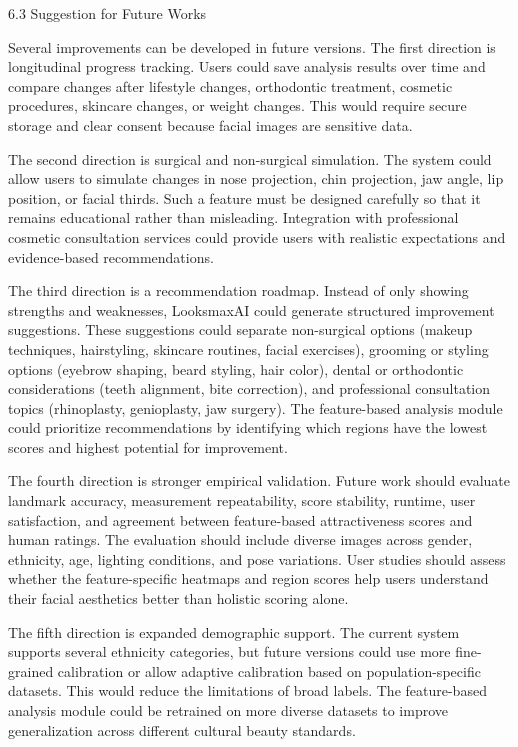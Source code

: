 6.3  Suggestion for Future Works

Several improvements can be developed in future versions. The first direction is longitudinal progress tracking. Users could save analysis results over time and compare changes after lifestyle changes, orthodontic treatment, cosmetic procedures, skincare changes, or weight changes. This would require secure storage and clear consent because facial images are sensitive data.

The second direction is surgical and non-surgical simulation. The system could allow users to simulate changes in nose projection, chin projection, jaw angle, lip position, or facial thirds. Such a feature must be designed carefully so that it remains educational rather than misleading. Integration with professional cosmetic consultation services could provide users with realistic expectations and evidence-based recommendations.

The third direction is a recommendation roadmap. Instead of only showing strengths and weaknesses, LooksmaxAI could generate structured improvement suggestions. These suggestions could separate non-surgical options (makeup techniques, hairstyling, skincare routines, facial exercises), grooming or styling options (eyebrow shaping, beard styling, hair color), dental or orthodontic considerations (teeth alignment, bite correction), and professional consultation topics (rhinoplasty, genioplasty, jaw surgery). The feature-based analysis module could prioritize recommendations by identifying which regions have the lowest scores and highest potential for improvement.

The fourth direction is stronger empirical validation. Future work should evaluate landmark accuracy, measurement repeatability, score stability, runtime, user satisfaction, and agreement between feature-based attractiveness scores and human ratings. The evaluation should include diverse images across gender, ethnicity, age, lighting conditions, and pose variations. User studies should assess whether the feature-specific heatmaps and region scores help users understand their facial aesthetics better than holistic scoring alone.

The fifth direction is expanded demographic support. The current system supports several ethnicity categories, but future versions could use more fine-grained calibration or allow adaptive calibration based on population-specific datasets. This would reduce the limitations of broad labels. The feature-based analysis module could be retrained on more diverse datasets to improve generalization across different cultural beauty standards.

